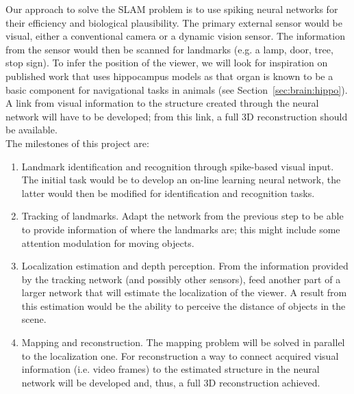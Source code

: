 Our approach to solve the SLAM problem is to use spiking neural networks for their efficiency and biological plausibility. The primary external sensor would be visual, either a conventional camera or a dynamic vision sensor. The information from the sensor would then be scanned for landmarks (e.g. a lamp, door, tree, stop sign). To infer the position of the viewer, we will look for inspiration on published work that uses hippocampus models as that organ is known to be a basic component for navigational tasks in animals (see Section~\ref{sec:brain:hippo}). A link from visual information to the structure created through the neural network will have to be developed; from this link, a full 3D reconstruction should be available.\\

The milestones of this project are:
\begin{enumerate}
  \item Landmark identification and recognition through spike-based visual input. The initial task would be to develop an on-line learning neural network, the latter would then be modified for identification and recognition tasks.
  \item Tracking of landmarks. Adapt the network from the previous step to be able to provide information of where the landmarks are; this might include some attention modulation for moving objects.
  \item Localization estimation and depth perception. From the information provided by the tracking network (and possibly other sensors), feed another part of a larger network that will estimate the localization of the viewer. A result from this estimation would be the ability to perceive the distance of objects in the scene. 
  \item Mapping and reconstruction. The mapping problem will be solved in parallel to the localization one. For reconstruction a way to connect acquired visual information (i.e. video frames) to the estimated structure in the neural network will be developed and, thus, a full 3D reconstruction achieved.
\end{enumerate}